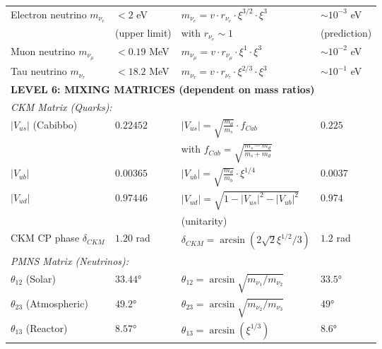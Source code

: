 \documentclass[12pt,a4paper]{article}
\begin{document}
\begin{longtable}{p{5cm}p{4cm}p{3.5cm}p{3.5cm}}
	Electron neutrino $m_{\nu_e}$ & $< 2$ eV & $m_{\nu_e} = v \cdot r_{\nu_e} \cdot \xi^{3/2} \cdot \xi^3$ & $\sim 10^{-3}$ eV \\
	& (upper limit) & with $r_{\nu_e} \sim 1$ & (prediction) \\[0.3em]
	
	Muon neutrino $m_{\nu_\mu}$ & $< 0.19$ MeV & $m_{\nu_\mu} = v \cdot r_{\nu_\mu} \cdot \xi^{1} \cdot \xi^3$ & $\sim 10^{-2}$ eV \\
	
	Tau neutrino $m_{\nu_\tau}$ & $< 18.2$ MeV & $m_{\nu_\tau} = v \cdot r_{\nu_\tau} \cdot \xi^{2/3} \cdot \xi^3$ & $\sim 10^{-1}$ eV \\
	
	\midrule
	\multicolumn{4}{l}{\textbf{LEVEL 6: MIXING MATRICES (dependent on mass ratios)}} \\
	\midrule
	
	\multicolumn{4}{l}{\textit{CKM Matrix (Quarks):}} \\
	
	$|V_{us}|$ (Cabibbo) & $0.22452$ & $|V_{us}| = \sqrt{\frac{m_d}{m_s}} \cdot f_{Cab}$ & $0.225$ \\
	& & with $f_{Cab} = \sqrt{\frac{m_s - m_d}{m_s + m_d}}$ & \\[0.3em]
	
	$|V_{ub}|$ & $0.00365$ & $|V_{ub}| = \sqrt{\frac{m_d}{m_b}} \cdot \xi^{1/4}$ & $0.0037$ \\
	
	$|V_{ud}|$ & $0.97446$ & $|V_{ud}| = \sqrt{1 - |V_{us}|^2 - |V_{ub}|^2}$ & $0.974$ \\
	& & (unitarity) & \\[0.3em]
	
	CKM CP phase $\delta_{CKM}$ & $1.20$ rad & $\delta_{CKM} = \arcsin(2\sqrt{2}\xi^{1/2}/3)$ & $1.2$ rad \\
	
	\multicolumn{4}{l}{\textit{PMNS Matrix (Neutrinos):}} \\
	
	$\theta_{12}$ (Solar) & $33.44°$ & $\theta_{12} = \arcsin\sqrt{m_{\nu_1}/m_{\nu_2}}$ & $33.5°$ \\
	
	$\theta_{23}$ (Atmospheric) & $49.2°$ & $\theta_{23} = \arcsin\sqrt{m_{\nu_2}/m_{\nu_3}}$ & $49°$ \\
	
	$\theta_{13}$ (Reactor) & $8.57°$ & $\theta_{13} = \arcsin(\xi^{1/3})$ & $8.6°$ \\
	

\end{longtable}
\end{document}
